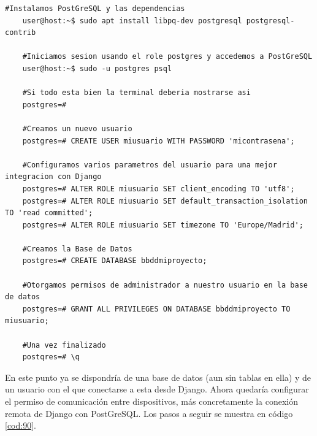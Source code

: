 \begin{lstlisting}[caption={Instrucciones por consola para iniciar una base de datos en PostGreSQL}, label=cod:89]
	#Instalamos PostGreSQL y las dependencias
	user@host:~$ sudo apt install libpq-dev postgresql postgresql-contrib
	
	#Iniciamos sesion usando el role postgres y accedemos a PostGreSQL
	user@host:~$ sudo -u postgres psql
	
	#Si todo esta bien la terminal deberia mostrarse asi
	postgres=# 
	
	#Creamos un nuevo usuario
	postgres=# CREATE USER miusuario WITH PASSWORD 'micontrasena';
	
	#Configuramos varios parametros del usuario para una mejor integracion con Django
	postgres=# ALTER ROLE miusuario SET client_encoding TO 'utf8';
	postgres=# ALTER ROLE miusuario SET default_transaction_isolation TO 'read committed';
	postgres=# ALTER ROLE miusuario SET timezone TO 'Europe/Madrid';
	
	#Creamos la Base de Datos
	postgres=# CREATE DATABASE bbddmiproyecto;
	
	#Otorgamos permisos de administrador a nuestro usuario en la base de datos
	postgres=# GRANT ALL PRIVILEGES ON DATABASE bbddmiproyecto TO miusuario;
	
	#Una vez finalizado
	postqres=# \q
\end{lstlisting}

En este punto ya se dispondría de una base de datos (aun sin tablas en ella) y de un usuario con el que conectarse a esta desde Django. Ahora quedaría configurar el permiso de comunicación entre dispositivos, más concretamente la conexión remota de Django con PostGreSQL. Los pasos a seguir se muestra en código \ref{cod:90}.

